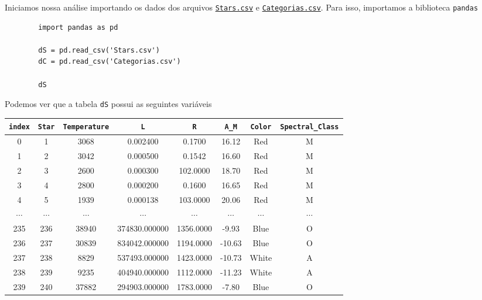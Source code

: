 

Iniciamos nossa análise importando os dados dos arquivos \href{https://raw.githubusercontent.com/Jimeens/Permanent_Files/refs/heads/main/PGF5393/Atividade1/Stars.csv}{\texttt{Stars.csv}} e \href{https://raw.githubusercontent.com/Jimeens/Permanent_Files/refs/heads/main/PGF5393/Atividade1/Categorias.csv}{\texttt{Categorias.csv}}. Para isso, importamos a biblioteca \verb|pandas|
\begin{longlisting}
    \begin{verbatim}
        import pandas as pd

        dS = pd.read_csv('Stars.csv')
        dC = pd.read_csv('Categorias.csv')

        dS
    \end{verbatim}
\end{longlisting}

Podemos ver que a tabela \verb|dS| possui as seguintes variáveis
\begin{table}[H]
    \centering
    \begin{tabular}{cccccccc}
        \toprule
        \verb|index| & \verb|Star| & \verb|Temperature| & \verb|L| & \verb|R| & \verb|A_M| & \verb|Color| & \verb|Spectral_Class| \\ 
        \midrule
        0 & 1 & 3068 & 0.002400 & 0.1700 & 16.12 & Red & M \\
        1 & 2 & 3042 & 0.000500 & 0.1542 & 16.60 & Red & M \\
        2 & 3 & 2600 & 0.000300 & 102.0000 & 18.70 & Red & M \\
        3 & 4 & 2800 & 0.000200 & 0.1600 & 16.65 & Red & M \\
        4 & 5 & 1939 & 0.000138 & 103.0000 & 20.06 & Red & M \\
        $\cdots$ & $\cdots$ & $\cdots$ & $\cdots$ & $\cdots$ & $\cdots$ & $\cdots$ & $\cdots$ \\
        235 & 236 & 38940 & 374830.000000 & 1356.0000 & -9.93 & Blue & O \\
        236 & 237 & 30839 & 834042.000000 & 1194.0000 & -10.63 & Blue & O \\
        237 & 238 & 8829 & 537493.000000 & 1423.0000 & -10.73 & White & A \\
        238 & 239 & 9235 & 404940.000000 & 1112.0000 & -11.23 & White & A \\
        239 & 240 & 37882 & 294903.000000 & 1783.0000 & -7.80 & Blue & O \\
        \bottomrule
    \end{tabular}
\end{table}

